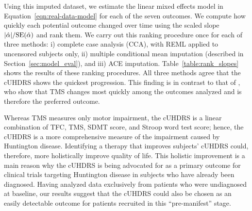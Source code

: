 \documentclass[12pt]{article}
\begin{document}
Using this imputed dataset, we estimate the linear mixed effects model in Equation~\eqref{eqn:real-data-model} for each of the seven outcomes. We compute how quickly each potential outcome changed over time using the scaled slope $|\hat{\alpha}|/ {\rm SE}(\hat{\alpha})$ and rank them. We carry out this ranking procedure once for each of three methods: i) complete case analysis (CCA), with REML applied to uncensored subjects only, ii) multiple conditional mean imputation (described in Section~\ref{sec:model_eval}), and iii) ACE imputation.
Table~\ref{table:rank_slopes} shows the results of these ranking procedures. All three methods agree that the cUHDRS shows the quickest progression. This finding is in contrast to that of \cite{langbehn2020clinical}, who 
show that TMS changes most quickly among the outcomes analyzed and is therefore the preferred outcome. 

Whereas TMS measures only motor impairment, the cUHDRS is a linear combination of TFC, TMS, SDMT score, and Stroop word test score; hence, the cUHDRS is a more comprehensive measure of the impairment caused by Huntington disease. Identifying a therapy that improves subjects' cUHDRS could, therefore, more holistically improve quality of life. 
This holistic improvement is a main reason why the cUHDRS is being advocated for as a primary outcome for clinical trials targeting Huntington disease in subjects who have already been diagnosed. Having analyzed data exclusively from patients who were undiagnosed at baseline, our results suggest that the cUHDRS could also be chosen as an easily detectable outcome for patients recruited in this ``pre-manifest'' stage.
\end{document}
